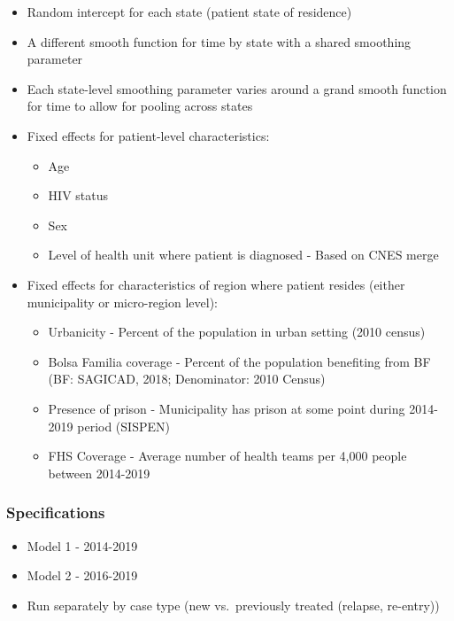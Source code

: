 \documentclass[
]{article}
\providecommand{\tightlist}{%
  \setlength{\itemsep}{0pt}\setlength{\parskip}{0pt}}
\begin{document}
\begin{itemize}
\item
  Random intercept for each state (patient state of residence)
\item
  A different smooth function for time by state with a shared smoothing
  parameter
\item
  Each state-level smoothing parameter varies around a grand smooth
  function for time to allow for pooling across states
\item
  Fixed effects for patient-level characteristics:

  \begin{itemize}
  \tightlist
  \item
    Age
  \item
    HIV status
  \item
    Sex
  \item
    Level of health unit where patient is diagnosed - Based on CNES
    merge
  \end{itemize}
\item
  Fixed effects for characteristics of region where patient resides
  (either municipality or micro-region level):

  \begin{itemize}
  \tightlist
  \item
    Urbanicity - Percent of the population in urban setting (2010
    census)
  \item
    Bolsa Familia coverage - Percent of the population benefiting from
    BF (BF: SAGICAD, 2018; Denominator: 2010 Census)
  \item
    Presence of prison - Municipality has prison at some point during
    2014-2019 period (SISPEN)
  \item
    FHS Coverage - Average number of health teams per 4,000 people
    between 2014-2019
  \end{itemize}
\end{itemize}

\hypertarget{specifications}{%
\subsubsection{Specifications}\label{specifications}}

\begin{itemize}
\item
  Model 1 - 2014-2019
\item
  Model 2 - 2016-2019
\item
  Run separately by case type (new vs.~previously treated (relapse,
  re-entry))
\end{itemize}
\end{document}
